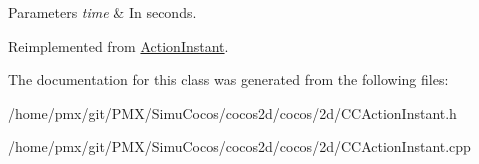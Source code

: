 \begin{DoxyParams}{Parameters}
{\em time} & In seconds. \\
\hline
\end{DoxyParams}


Reimplemented from \hyperlink{classActionInstant_a59875bf08cd1f58c0c8c6693ac540ade}{Action\+Instant}.



The documentation for this class was generated from the following files\+:\begin{DoxyCompactItemize}
\item 
/home/pmx/git/\+P\+M\+X/\+Simu\+Cocos/cocos2d/cocos/2d/C\+C\+Action\+Instant.\+h\item 
/home/pmx/git/\+P\+M\+X/\+Simu\+Cocos/cocos2d/cocos/2d/C\+C\+Action\+Instant.\+cpp\end{DoxyCompactItemize}
